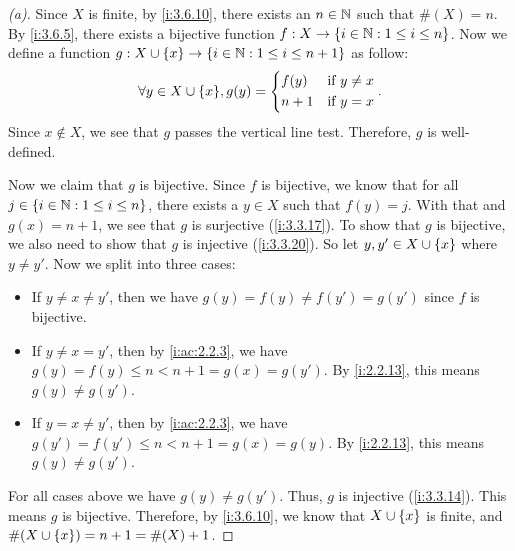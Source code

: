 \begin{proof}[(a)]
  Since \(X\) is finite, by \cref{i:3.6.10}, there exists an \(n \in \mathbb{N}\) such that \(\#(X) = n\).
  By \cref{i:3.6.5}, there exists a bijective function \(f : X \to \left\lbrace i \in \mathbb{N} : 1 \leq i \leq n\right\rbrace\).
  Now we define a function \(g : X \cup \left\lbrace x\right\rbrace \to \left\lbrace i \in \mathbb{N} : 1 \leq i \leq n + 1\right\rbrace\) as follow:
  \[
    \forall y \in X \cup \set{x}, g(y) = \begin{dcases}
      f(y)  & \text{if } y \neq x \\
      n + 1 & \text{if } y = x
    \end{dcases}.
  \]
  Since \(x \notin X\), we see that \(g\) passes the vertical line test.
  Therefore, \(g\) is well-defined.

  Now we claim that \(g\) is bijective.
  Since \(f\) is bijective, we know that for all \(j \in \left\lbrace i \in \mathbb{N} : 1 \leq i \leq n\right\rbrace\), there exists a \(y \in X\) such that \(f(y) = j\).
  With that and \(g(x) = n + 1\), we see that \(g\) is surjective (\cref{i:3.3.17}).
  To show that \(g\) is bijective, we also need to show that \(g\) is injective (\cref{i:3.3.20}).
  So let \(y, y' \in X \cup \left\lbrace x\right\rbrace\) where \(y \neq y'\).
  Now we split into three cases:
  \begin{itemize}
    \item If \(y \neq x \neq y'\), then we have \(g(y) = f(y) \neq f(y') = g(y')\) since \(f\) is bijective.
    \item If \(y \neq x = y'\), then by \cref{i:ac:2.2.3}, we have \(g(y) = f(y) \leq n < n + 1 = g(x) = g(y')\).
          By \cref{i:2.2.13}, this means \(g(y) \neq g(y')\).
    \item If \(y = x \neq y'\), then by \cref{i:ac:2.2.3}, we have \(g(y') = f(y') \leq n < n + 1 = g(x) = g(y)\).
          By \cref{i:2.2.13}, this means \(g(y) \neq g(y')\).
  \end{itemize}
  For all cases above we have \(g(y) \neq g(y')\).
  Thus, \(g\) is injective (\cref{i:3.3.14}).
  This means \(g\) is bijective.
  Therefore, by \cref{i:3.6.10}, we know that \(X \cup \left\lbrace x\right\rbrace\) is finite, and \(\#(X \cup \left\lbrace x\right\rbrace) = n + 1 = \#(X) + 1\).
\end{proof}

